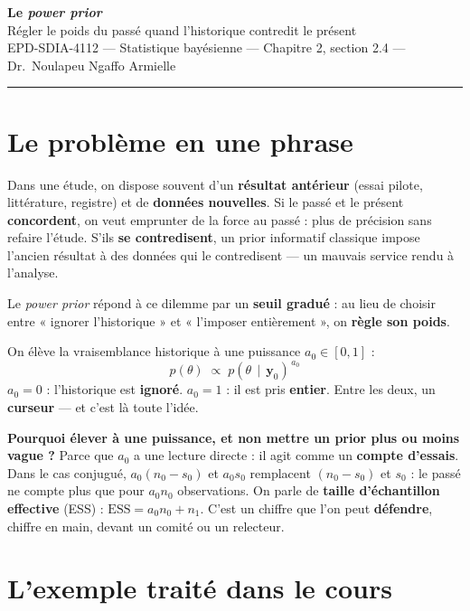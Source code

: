\documentclass[11pt,a4paper]{article}
\newcommand{\given}{\,\mid\,}
\newcommand{\data}{\mathbf{y}}
\begin{document}
\begin{center}
{\LARGE\bfseries\color{bleu} Le \emph{power prior}}\\[3pt]
{\large Régler le poids du passé quand l'historique contredit le présent}\\[5pt]
{\small\color{gris} EPD-SDIA-4112 --- Statistique bayésienne --- Chapitre 2, section 2.4 ---
Dr.\ Noulapeu Ngaffo Armielle}
\end{center}

\vspace{-2pt}
\hrule
\vspace{6pt}

\section{Le problème en une phrase}

Dans une étude, on dispose souvent d'un \textbf{résultat antérieur} (essai pilote,
littérature, registre) et de \textbf{données nouvelles}. Si le passé et le présent
\textbf{concordent}, on veut emprunter de la force au passé : plus de précision sans
refaire l'étude. S'ils \textbf{se contredisent}, un prior informatif classique impose
l'ancien résultat à des données qui le contredisent --- un mauvais service rendu à l'analyse.

Le \emph{power prior} répond à ce dilemme par un \textbf{seuil gradué} : au lieu de choisir
entre « ignorer l'historique » et « l'imposer entièrement », on \textbf{règle son poids}.

\begin{idee}
On élève la vraisemblance historique à une puissance $a_0 \in [0,1]$ :
\[
p(\theta) \;\propto\; p(\theta \given \data_0)^{\,a_0}
\]
$a_0 = 0$ : l'historique est \textbf{ignoré}. \quad
$a_0 = 1$ : il est pris \textbf{entier}. \quad
Entre les deux, un \textbf{curseur} --- et c'est là toute l'idée.
\end{idee}

\textbf{Pourquoi élever à une puissance, et non mettre un prior plus ou moins vague ?}
Parce que $a_0$ a une lecture directe : il agit comme un \textbf{compte d'essais}. Dans le
cas conjugué, $a_0(n_0 - s_0)$ et $a_0 s_0$ remplacent $(n_0-s_0)$ et $s_0$ : le passé ne
compte plus que pour $a_0 n_0$ observations. On parle de \textbf{taille d'échantillon
effective} (ESS) : $\text{ESS} = a_0 n_0 + n_1$. C'est un chiffre que l'on peut
\textbf{défendre}, chiffre en main, devant un comité ou un relecteur.

\section{L'exemple traité dans le cours}
\end{document}
